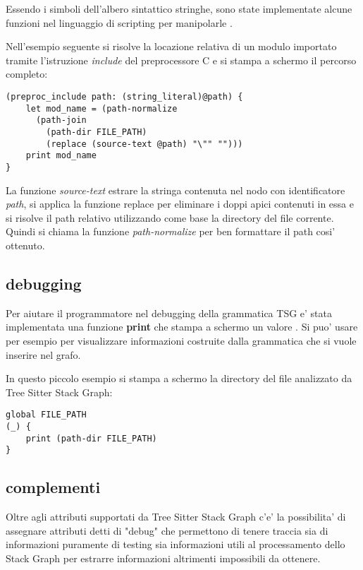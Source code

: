 Essendo i simboli dell'albero sintattico stringhe, sono state implementate alcune funzioni nel linguaggio di scripting per manipolarle \cite{TreeSitterGraphReferenceFunctions} \cite{TreeSitterStackGraphPaths}.

Nell'esempio seguente si risolve la locazione relativa di un modulo importato tramite l'istruzione \emph{include} del preprocessore C e si stampa a schermo il percorso completo:

\begin{Verbatim}[samepage=true]
(preproc_include path: (string_literal)@path) {
    let mod_name = (path-normalize
      (path-join
        (path-dir FILE_PATH)
        (replace (source-text @path) "\"" "")))
    print mod_name
}
\end{Verbatim}

La funzione \emph{source-text} estrare la stringa contenuta nel nodo con identificatore \emph{path}, si applica la funzione replace per eliminare i doppi apici contenuti in essa e si risolve il path relativo utilizzando come base la directory del file corrente.
Quindi si chiama la funzione \emph{path-normalize} per ben formattare il path cosi' ottenuto.

\subsection{debugging}

Per aiutare il programmatore nel debugging della grammatica TSG e' stata implementata una funzione \textbf{print} che stampa a schermo un valore \cite{TreeSitterGraphReferenceDebugging}.
Si puo' usare per esempio per visualizzare informazioni costruite dalla grammatica che si vuole inserire nel grafo.

In questo piccolo esempio si stampa a schermo la directory del file analizzato da Tree Sitter Stack Graph:

\begin{Verbatim}[samepage=true]
global FILE_PATH
(_) {
    print (path-dir FILE_PATH)
}
\end{Verbatim}

\subsection{complementi}

Oltre agli attributi supportati da Tree Sitter Stack Graph c'e' la possibilita' di assegnare attributi detti di "debug" \cite{TreeSitterStackGraphDebugInfo} che permettono di tenere traccia sia di informazioni puramente di testing sia informazioni utili al processamento dello Stack Graph per estrarre informazioni altrimenti impossibili da ottenere.

